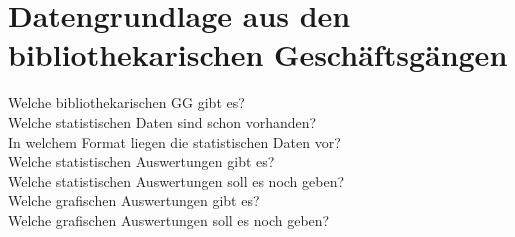 \section{Datengrundlage aus den bibliothekarischen Geschäftsgängen}


Welche bibliothekarischen GG gibt es?\\
Welche statistischen Daten sind schon vorhanden?\\
In welchem Format liegen die statistischen Daten vor?\\
Welche statistischen Auswertungen gibt es?\\
Welche statistischen Auswertungen soll es noch geben?\\
Welche grafischen Auswertungen gibt es?\\
Welche grafischen Auswertungen soll es noch geben?

\clearpage

